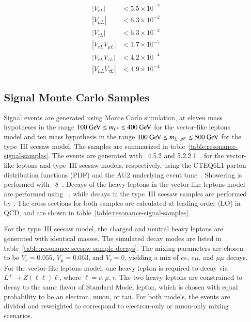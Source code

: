 \begin{align}
|V_{e L}| & <5.5\times10^{-2}\\
|V_{\mu L}| & <6.3\times10^{-2}\\
|V_{\tau L}| & <6.3\times10^{-2}\\
|V_{e L}V_{\mu L}| & <1.7\times10^{-7}\\
|V_{e L}V_{\tau L}| & <4.2\times10^{-4}\\
|V_{\mu L}V_{\tau L}| & <4.9\times10^{-4}
\end{align}

\subsection{Signal Monte Carlo Samples}\label{sec:resonance-signal-mc-samples}

Signal events are generated using Monte Carlo simulation, at eleven mass hypotheses in the range $100 \GeV \leq m_{\lpm} \leq 400 \GeV$ for the vector-like leptons model and ten mass hypothesis in the range $100 \GeV \leq m_{\lpm,\lzero}\leq 500 \GeV$ for the type~III seesaw model. The samples are summarized in table~\ref{table:resonance-signal-samples}. The events are generated with \madgraph~4.5.2 and 5.2.2.1~\cite{madgraph}, for the vector-like leptons and type~III seesaw models, respectively, using the CTEQ6L1\cite{ct6l1} parton distribution functions (PDF) and the AU2 underlying event tune~\cite{AU2}. Showering is performed with \pythia\ 8~\cite{Sjostrand:2007gs}. Decays of the heavy leptons in the vector-like leptons model are performed using \bridge~\cite{bridge}, while decays in the type~III seesaw samples are performed by \madgraph. The cross sections for both samples are calculated at leading order (LO) in QCD, and are shown in table~\ref{table:resonance-signal-samples}. 

For the type~III seesaw model, the charged and neutral heavy leptons are generated with identical masses. The simulated decay modes are listed in table~\ref{table:resonance-seesaw-sample-decays}. The mixing parameters are chosen to be $V_e=0.055$, $V_{\mu}=0.063$, and $V_{\tau}=0$, yielding a mix of $ee$, $e\mu$, and $\mu\mu$ decays. For the vector-like leptons model, one heavy lepton is required to decay via $L^{\pm}\rightarrow Z(\ell\ell)\ell$, where $\ell=e,\mu,\tau$. The two heavy leptons are constrained to decay to the same flavor of Standard Model lepton, which is chosen with equal probability to be an electron, muon, or tau. For both models, the events are divided and reweighted to correspond to electron-only or muon-only mixing scenarios. 

